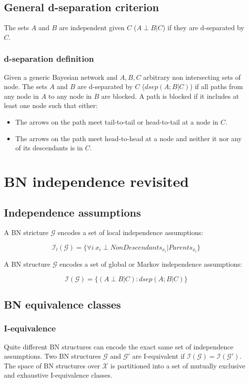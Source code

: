 	\subsection{General d-separation criterion}
	The sets $A$ and $B$ are independent given $C$ ($A\perp B|C $) if they are d-separated by $C$.

		\subsubsection{d-separation definition}
		Given a generic Bayesian network and $A,B,C$ arbitrary non intersecting sets of node.
		The sets $A$ and $B$ are d-separated by $C$ ($dsep(A;B|C)$) if all paths from any node in $A$ to any node in $B$ are blocked.
		A path is blocked if it includes at least one node such that either:

		\begin{multicols}{2}
			\begin{itemize}
				\item The arrows on the path meet tail-to-tail or head-to-tail at a node in $C$.
				\item The arrows on the path meet head-to-head at a node and neither it nor any of its descendants is in $C$.
			\end{itemize}
		\end{multicols}

\section{BN independence revisited}

	\subsection{Independence assumptions}
	A BN stricture $\mathcal{G}$ encodes a set of local independence assumptions:

	$$\mathcal{I}_l(\mathcal{G}) = \{\forall i\ x_i \perp NonDescendants_{x_i} | Parents_{x_i}\}$$

	A BN structure $\mathcal{G}$ encodes a set of global or Markov independence assumptions:

	$$\mathcal{I}(\mathcal{G}) = \{(A\perp B |C):dsep(A;B|C)\}$$

	\subsection{BN equivalence classes}

		\subsubsection{I-equivalence}
		Quite different BN structures can encode the exact same set of independence assumptions.
		Two BN structures $\mathcal{G}$ and $\mathcal{G}'$ are I-equivalent if $\mathcal{I}(\mathcal{G})=\mathcal{I}(\mathcal{G}')$.
		The space of BN structures over $\mathcal{X}$ is partitioned into a set of mutually exclusive and exhaustive I-equivalence classes.


